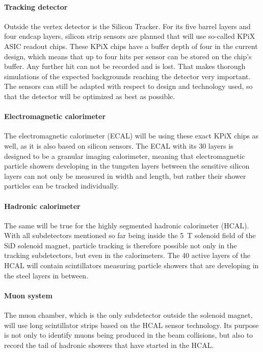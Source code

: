 \paragraph{Tracking detector}
Outside the vertex detector is the Silicon Tracker.
For its five barrel layers and four endcap layers, silicon strip sensors are planned that will use so-called KPiX ASIC readout chips.
These KPiX chips have a buffer depth of four in the current design, which means that up to four hits per sensor can be stored on the chip's buffer.
Any further hit can not be recorded and is lost.
That makes thorough simulations of the expected backgrounds reaching the detector very important.
The sensors can still be adapted with respect to design and technology used, so that the detector will be optimized as best as possible.
\paragraph{Electromagnetic calorimeter}
The electromagnetic calorimeter (ECAL) will be using these exact KPiX chips as well, as it is also based on silicon sensors.
The ECAL with its 30 layers is designed to be a granular imaging calorimeter, meaning that electromagnetic particle showers developing in the tungsten layers between the sensitive silicon layers can not only be measured in width and length, but rather their shower particles can be tracked individually.
\paragraph{Hadronic calorimeter}
The same will be true for the highly segmented hadronic calorimeter (HCAL).
With all subdetectors mentioned so far being inside the \SI{5}{\tesla} solenoid field of the SiD solenoid magnet, particle tracking is therefore possible not only in the tracking subdetectors, but even in the calorimeters.
The 40 active layers of the HCAL will contain scintillators measuring particle showers that are developing in the steel layers in between.
\paragraph{Muon system}
The muon chamber, which is the only subdetector outside the solenoid magnet, will use long scintillator strips based on the HCAL sensor technology.
Its purpose is not only to identify muons being produced in the beam collisions, but also to record the tail of hadronic showers that have started in the HCAL.
